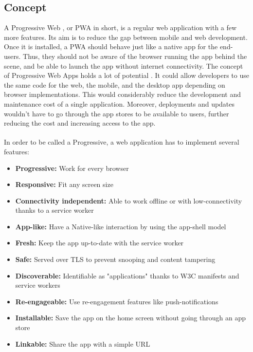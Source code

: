 \documentclass{kththesis}
\begin{document}
\subsection{Concept}

A Progressive Web , or PWA in short, is a regular web application with a few more features. Its aim is to reduce the gap between mobile and web development. Once it is installed, a PWA should behave just like a native app for the end-users. Thus, they should not be aware of the browser running the app behind the scene, and be able to launch the app without internet connectivity. \newline
The concept of Progressive Web Apps holds a lot of potential \cite{PWApossibleUnifer}. It could allow developers to use the same code for the web, the mobile, and the desktop app depending on browser implementations. This would considerably reduce the development and maintenance cost of a single application. Moreover, deployments and updates wouldn't have to go through the app stores to be available to users, further reducing the cost and increasing access to the app.
\paragraph{}
In order to be called a Progressive, a web application has to implement several features\cite{PWA_def}:
\textendash
\begin{itemize}
    \item \textbf{Progressive:} Work for every browser
    \item \textbf{Responsive:} Fit any screen size
    \item \textbf{Connectivity independent:} Able to work offline or with low-connectivity thanks to a service worker
    \item \textbf{App-like:} Have a Native-like interaction by using the app-shell model
    \item \textbf{Fresh:} Keep the app up-to-date with the service worker
    \item \textbf{Safe:} Served over TLS to prevent snooping and content tampering
    \item \textbf{Discoverable:} Identifiable as "applications" thanks to W3C manifests and service workers
    \item \textbf{Re-engageable:} Use re-engagement features like push-notifications
    \item \textbf{Installable:} Save the app on the home screen without going through an app store
    \item \textbf{Linkable:} Share the app with a simple URL
\end{itemize}
\end{document}
